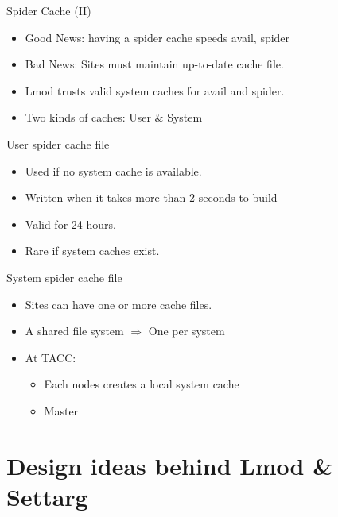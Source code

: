 \documentclass{beamer}
\begin{document}
\begin{frame}{Spider Cache (II)}
  \begin{itemize}
     \item Good News: having a spider cache speeds avail, spider
     \item Bad News: Sites must maintain up-to-date cache file.
     \item Lmod trusts valid system caches for avail and spider.
     \item Two kinds of caches: User \& System 
  \end{itemize}
\end{frame}

\begin{frame}{User spider cache file}
  \begin{itemize}
     \item Used if no system cache is available.
     \item Written when it takes more than 2 seconds to build
     \item Valid for 24 hours.
     \item Rare if system caches exist.
  \end{itemize}
\end{frame}

\begin{frame}{System spider cache file}
  \begin{itemize}
     \item Sites can have one or more cache files.
     \item A shared file system $\Rightarrow$ One
       per system
     \item At TACC: 
       \begin{itemize}
          \item Each nodes creates a local system cache
          \item Master 
       \end{itemize}
  \end{itemize}
\end{frame}


\section{Design ideas behind Lmod \& Settarg}
\end{document}
